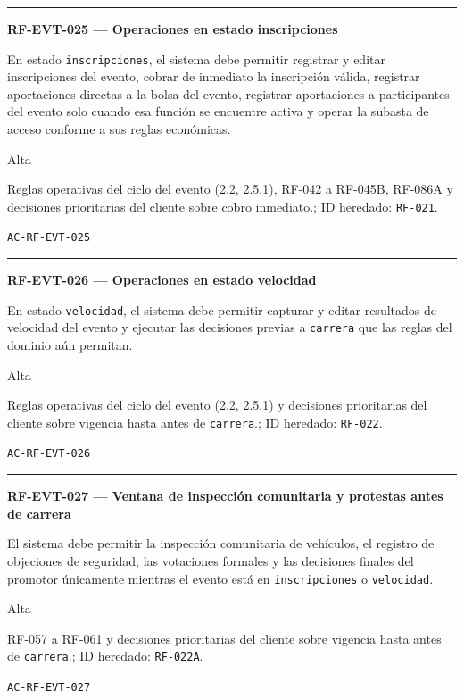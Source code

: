 \documentclass[10pt,letterpaper]{article}
\begin{document}
\vspace{0.25em}\hrule\vspace{0.65em}
\noindent\textbf{RF-EVT-025 --- Operaciones en estado inscripciones}\par
\begin{description}[style=nextline,leftmargin=3.15cm,labelwidth=2.8cm,font=\normalfont\bfseries]
\item[Obligación] En estado \texttt{inscripciones}, el sistema debe permitir registrar y editar inscripciones del evento, cobrar de inmediato la inscripción válida, registrar aportaciones directas a la bolsa del evento, registrar aportaciones a participantes del evento solo cuando esa función se encuentre activa y operar la subasta de acceso conforme a sus reglas económicas.
\item[Prioridad] Alta
\item[Procedencia] Reglas operativas del ciclo del evento (2.2, 2.5.1), RF-042 a RF-045B, RF-086A y decisiones prioritarias del cliente sobre cobro inmediato.; ID heredado: \texttt{RF-021}.
\item[Verificación] \texttt{AC-RF-EVT-025}
\end{description}
\vspace{0.25em}\hrule\vspace{0.65em}
\noindent\textbf{RF-EVT-026 --- Operaciones en estado velocidad}\par
\begin{description}[style=nextline,leftmargin=3.15cm,labelwidth=2.8cm,font=\normalfont\bfseries]
\item[Obligación] En estado \texttt{velocidad}, el sistema debe permitir capturar y editar resultados de velocidad del evento y ejecutar las decisiones previas a \texttt{carrera} que las reglas del dominio aún permitan.
\item[Prioridad] Alta
\item[Procedencia] Reglas operativas del ciclo del evento (2.2, 2.5.1) y decisiones prioritarias del cliente sobre vigencia hasta antes de \texttt{carrera}.; ID heredado: \texttt{RF-022}.
\item[Verificación] \texttt{AC-RF-EVT-026}
\end{description}
\vspace{0.25em}\hrule\vspace{0.65em}
\noindent\textbf{RF-EVT-027 --- Ventana de inspección comunitaria y protestas antes de carrera}\par
\begin{description}[style=nextline,leftmargin=3.15cm,labelwidth=2.8cm,font=\normalfont\bfseries]
\item[Obligación] El sistema debe permitir la inspección comunitaria de vehículos, el registro de objeciones de seguridad, las votaciones formales y las decisiones finales del promotor únicamente mientras el evento está en \texttt{inscripciones} o \texttt{velocidad}.
\item[Prioridad] Alta
\item[Procedencia] RF-057 a RF-061 y decisiones prioritarias del cliente sobre vigencia hasta antes de \texttt{carrera}.; ID heredado: \texttt{RF-022A}.
\item[Verificación] \texttt{AC-RF-EVT-027}
\end{description}
\end{document}
